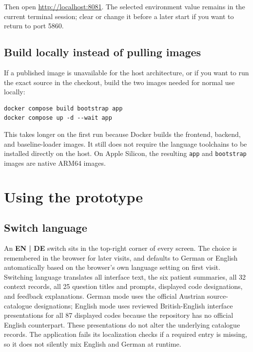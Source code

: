 \documentclass[11pt,a4paper]{article}
\begin{document}
Then open \url{http://localhost:8081}. The selected environment value remains
in the current terminal session; clear or change it before a later start if
you want to return to port 5860.

\subsection{Build locally instead of pulling images}
\label{sec:local-build}

If a published image is unavailable for the host architecture, or if you want
to run the exact source in the checkout, build the two images needed for
normal use locally:

\begin{lstlisting}[style=terminal]
docker compose build bootstrap app
docker compose up -d --wait app
\end{lstlisting}

This takes longer on the first run because Docker builds the frontend,
backend, and baseline-loader images. It still does not require the language
toolchains to be installed directly on the host. On Apple Silicon, the
resulting \texttt{app} and \texttt{bootstrap} images are native ARM64 images.

\section{Using the prototype}
\label{sec:learner-workflow}

\subsection{Switch language}

An \textbf{EN | DE} switch sits in the top-right corner of every screen.
The choice is remembered in the browser for later visits, and defaults to
German or English automatically based on the browser's own language
setting on first visit. Switching language translates all interface text,
the six patient summaries, all 32 context records, all 25 question titles
and prompts, displayed code designations, and feedback explanations. German
mode uses the official Austrian source-catalogue designations; English mode
uses reviewed British-English interface presentations for all 87 displayed
codes because the repository has no official English counterpart. These
presentations do not alter the underlying catalogue records. The application
fails its localization checks if a required entry is missing, so it does not
silently mix English and German at runtime.
\end{document}
